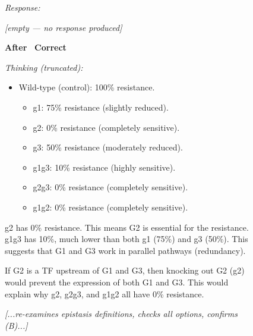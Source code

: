 \begin{figure}[t]
\begin{minipage}[t]{0.49\textwidth}
\begin{mdframed}[style=beforebox]
\begin{mdframed}[style=thinkbox]
\end{mdframed}
\vspace{2pt}
\noindent\textit{Response:}
\begin{mdframed}[style=thinkbox]
\textit{[empty --- no response produced]}
\end{mdframed}
\end{mdframed}
\end{minipage}%
\hfill
\begin{minipage}[t]{0.49\textwidth}
\begin{mdframed}[style=afterbox]
\noindent\textbf{After \sdrlfootnotesize} \hfill {\colorbox{afterbg}{\textcolor{afterframe}{\textbf{\checkmark~Correct}}}}

\noindent\textit{Thinking (truncated):}
\begin{mdframed}[style=thinkbox]
\begin{itemize}[leftmargin=12pt, labelsep=4pt, itemsep=0pt, parsep=0pt, topsep=0pt]
\item Wild-type (control): 100\% resistance.
  \begin{itemize}[leftmargin=12pt, labelsep=4pt, itemsep=0pt, parsep=0pt, topsep=0pt]
  \item g1: 75\% resistance (slightly reduced).
  \item g2: 0\% resistance (completely sensitive).
  \item g3: 50\% resistance (moderately reduced).
  \item g1g3: 10\% resistance (highly sensitive).
  \item g2g3: 0\% resistance (completely sensitive).
  \item g1g2: 0\% resistance (completely sensitive).
  \end{itemize}
\end{itemize}
g2 has 0\% resistance. This means G2 is essential for the resistance. g1g3 has 10\%, much lower than both g1 (75\%) and g3 (50\%). This suggests that G1 and G3 work in parallel pathways (redundancy).

\noindent If G2 is a TF upstream of G1 and G3, then knocking out G2 (g2) would prevent the expression of both G1 and G3. This would explain why g2, g2g3, and g1g2 all have 0\% resistance.

\vspace{2pt}
\noindent\textit{[...re-examines epistasis definitions, checks all options, confirms (B)...]}
\vspace{2pt}


\end{mdframed}
\end{mdframed}
\end{minipage}
\end{figure}
